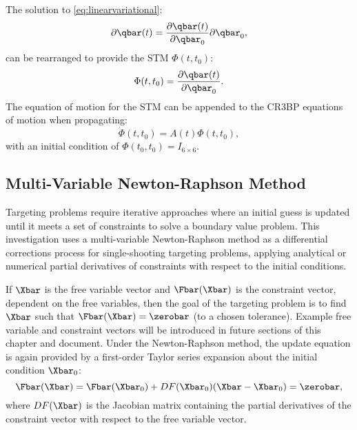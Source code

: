 The solution to \cref{eq:linearvariational}:
\begin{equation}
    \partial\qbar(t)=\frac{\partial\qbar(t)}{\partial\qbar_{0}}\partial\qbar_{0},
    \label{eq:variationalsolution}
\end{equation}
can be rearranged to provide the STM $\Phi(t,t_{0})$:
\begin{equation}
    \Phi(t,t_{0})=\frac{\partial\qbar(t)}{\partial\qbar_{{0}}}.
    \label{eq:STM}
\end{equation}
The equation of motion for the STM can be appended to the CR3BP equations of
motion when propagating:
\begin{equation}
    \dot{\Phi}(t,t_{0})=A(t)\Phi(t,t_{0}),
    \label{eq:STMEoM}
\end{equation}
with an initial condition of $\Phi(t_{0},t_{0})=I_{6\times6}$.

\subsection{Multi-Variable Newton-Raphson Method}
Targeting problems require iterative approaches where an initial guess is
updated until it meets a set of constraints to solve a boundary value problem.
This investigation uses a multi-variable Newton-Raphson method as a
differential corrections process for single-shooting targeting problems,
applying analytical or numerical partial derivatives of constraints with
respect to the initial conditions.

If $\Xbar$ is the free variable vector and $\Fbar(\Xbar)$ is the constraint
vector, dependent on the free variables, then the goal of the targeting problem
is to find $\Xbar$ such that $\Fbar(\Xbar)=\zerobar$ (to a chosen tolerance).
Example free variable and constraint vectors will be introduced in future
sections of this chapter and document. Under the Newton-Raphson method, the
update equation is again provided by a first-order Taylor series expansion
about the initial condition $\Xbar_{0}$:
\begin{equation}
    \Fbar(\Xbar)=\Fbar(\Xbar_{0})+DF(\Xbar_{0})(\Xbar-\Xbar_{0})=\zerobar,
    \label{eq:updateequation}
\end{equation}
where $DF(\Xbar)$ is the Jacobian matrix containing the partial derivatives of
the constraint vector with respect to the free variable vector.

